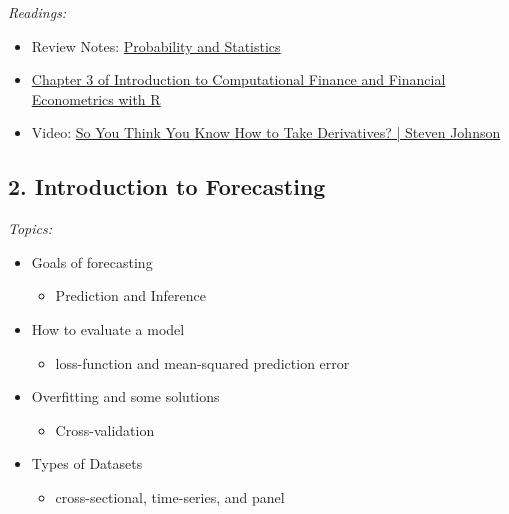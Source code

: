 \documentclass[12pt]{article}
\begin{document}
\bigskip
\noindent\emph{Readings:}

\begin{itemize}
  \item Review Notes: \href{https://nbviewer.org/github/kylebutts/UARK_5753/blob/main/01-Linear_Algebra/Review_Probability_and_Statistics/Review_Probability_and_Statistics.pdf}{Probability and Statistics}

  \item \href{https://bookdown.org/compfinezbook/introcompfinr/Matrix-Algebra-Review.html}{Chapter 3 of Introduction to Computational Finance and Financial Econometrics with R}

  \item Video: \href{https://www.youtube.com/watch?v=-l7JHalBubw}{So You Think You Know How to Take Derivatives? | Steven Johnson}
\end{itemize}


\subsection*{2. Introduction to Forecasting}

\noindent\emph{Topics:}

\begin{itemize}
  \item Goals of forecasting
  \begin{itemize}
    \item Prediction and Inference
  \end{itemize}

  \item How to evaluate a model
  \begin{itemize}
    \item loss-function and mean-squared prediction error
  \end{itemize}

  \item Overfitting and some solutions
  \begin{itemize}
    \item Cross-validation
  \end{itemize}

  \item Types of Datasets
  \begin{itemize}
    \item cross-sectional, time-series, and panel
  \end{itemize}
\end{itemize}
\end{document}
